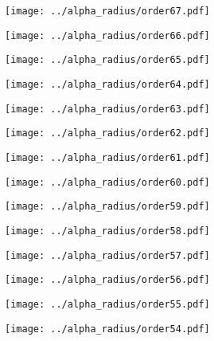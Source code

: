 \documentclass{article}
\begin{document}
\begin{figure}[H]
    \centering
    \texttt{[image: ../alpha\_radius/order67.pdf]}
\end{figure}
\begin{figure}[H]
    \centering
    \texttt{[image: ../alpha\_radius/order66.pdf]}
\end{figure}
\begin{figure}[H]
    \centering
    \texttt{[image: ../alpha\_radius/order65.pdf]}
\end{figure}
\begin{figure}[H]
    \centering
    \texttt{[image: ../alpha\_radius/order64.pdf]}
\end{figure}
\begin{figure}[H]
    \centering
    \texttt{[image: ../alpha\_radius/order63.pdf]}
\end{figure}
\begin{figure}[H]
    \centering
    \texttt{[image: ../alpha\_radius/order62.pdf]}
\end{figure}
\begin{figure}[H]
    \centering
    \texttt{[image: ../alpha\_radius/order61.pdf]}
\end{figure}
\begin{figure}[H]
    \centering
    \texttt{[image: ../alpha\_radius/order60.pdf]}
\end{figure}
\begin{figure}[H]
    \centering
    \texttt{[image: ../alpha\_radius/order59.pdf]}
\end{figure}
\begin{figure}[H]
    \centering
    \texttt{[image: ../alpha\_radius/order58.pdf]}
\end{figure}
\begin{figure}[H]
    \centering
    \texttt{[image: ../alpha\_radius/order57.pdf]}
\end{figure}
\begin{figure}[H]
    \centering
    \texttt{[image: ../alpha\_radius/order56.pdf]}
\end{figure}
\begin{figure}[H]
    \centering
    \texttt{[image: ../alpha\_radius/order55.pdf]}
\end{figure}
\begin{figure}[H]
    \centering
    \texttt{[image: ../alpha\_radius/order54.pdf]}
\end{figure}
\end{document}
